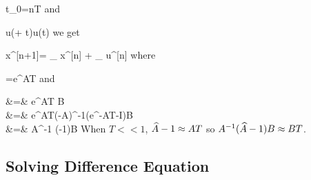   \beq
  t_0=nT
  \eeq
  and
  
  \beq
   u(\tau + t)\approx u(t)
  \quad{}
  \eeq
  we get
  
  \beq
  x^{[n+1]}=
  _{}
  x^{[n]}
    +
    _{}
    \;u^{[n]}
 \eeq
 where
 
 \beq
 =e^{AT}
 \eeq
 and
 
 \beqa
 &=&
 e^{AT}
    B
 \\
 &=&
 e^{AT}(-A)^{-1}(e^{-AT}-I)B
 \\
 &=&
 A^{-1}
 (-1)B
 \eeqa
 When $T<<1$,
 ${\widehat{A}}-1\approx AT$
 so $A^{-1}
 ({\widehat{A}}-1)B\approx BT$.
 
 \subsection{Solving Difference Equation}
 
